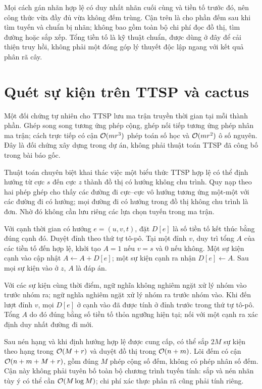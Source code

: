 Mọi cách gán nhãn hợp lệ có duy nhất nhãn cuối cùng và tiền tố trước đó, nên công thức vừa đầy đủ vừa không đếm trùng. Cận trên là cho phần đếm sau khi tìm tuyến và chuẩn bị nhãn; không bao gồm toàn bộ chi phí đọc đồ thị, tìm đường hoặc sắp xếp. Tổng tiền tố là kỹ thuật chuẩn, được dùng ở đây để cải thiện truy hồi, không phải một đóng góp lý thuyết độc lập ngang với kết quả phân rã cây.

\section{Quét sự kiện trên TTSP và cactus}

Một đối chứng tự nhiên cho TTSP lưu ma trận truyền thời gian tại mỗi thành phần. Ghép song song tương ứng phép cộng, ghép nối tiếp tương ứng phép nhân ma trận; cách trực tiếp có cận $\mathcal{O}(mr^3)$ phép toán số học và $\mathcal{O}(mr^2)$ ô số nguyên. Đây là đối chứng xây dựng trong dự án, không phải thuật toán TTSP đã công bố trong bài báo gốc.

Thuật toán chuyên biệt khai thác việc một biểu thức TTSP hợp lệ có thể định hướng từ cực $s$ đến cực $z$ thành đồ thị có hướng không chu trình. Quy nạp theo hai phép ghép cho thấy các đường đi cực--cực vô hướng tương ứng một-một với các đường đi có hướng; mọi đường đi có hướng trong đồ thị không chu trình là đơn. Nhờ đó không cần lưu riêng các lựa chọn tuyến trong ma trận.

Với cạnh thời gian có hướng $e=(u,v,t)$, đặt $D[e]$ là số tiền tố kết thúc bằng đúng cạnh đó. Duyệt đỉnh theo thứ tự tô-pô. Tại một đỉnh $v$, duy trì tổng $A$ của các tiền tố đến hợp lệ, khởi tạo $A=1$ nếu $v=s$ và $0$ nếu không. Một sự kiện cạnh vào cập nhật $A\leftarrow A+D[e]$; một sự kiện cạnh ra nhận $D[e]\leftarrow A$. Sau mọi sự kiện vào ở $z$, $A$ là đáp án.

Với các sự kiện cùng thời điểm, ngữ nghĩa không nghiêm ngặt xử lý nhóm vào trước nhóm ra; ngữ nghĩa nghiêm ngặt xử lý nhóm ra trước nhóm vào. Khi đến lượt đỉnh $v$, mọi $D[e]$ ở cạnh vào đã được tính ở đỉnh trước trong thứ tự tô-pô. Tổng $A$ do đó đúng bằng số tiền tố thỏa ngưỡng hiện tại; nối với một cạnh ra xác định duy nhất đường đi mới.

Sau nén hạng và khi định hướng hợp lệ được cung cấp, có thể sắp $2M$ sự kiện theo hạng trong $\mathcal{O}(M+r)$ và duyệt đồ thị trong $\mathcal{O}(n+m)$. Lõi đếm có cận $\mathcal{O}(n+m+M+r)$, gồm đúng $M$ phép cộng số đếm, không có phép nhân số đếm. Cận này không phải tuyên bố toàn bộ chương trình tuyến tính: sắp và nén nhãn tùy ý có thể cần $\mathcal{O}(M\log M)$; chi phí xác thực phân rã cũng phải tính riêng.

